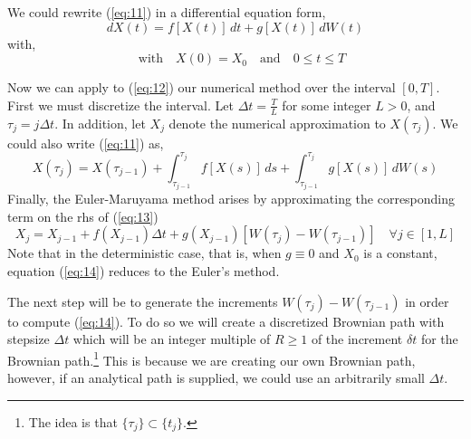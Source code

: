 \documentclass[12pt,a4paper]{article}
\def\d{\delta}
\begin{document}
We could rewrite (\ref{eq:11}) in a differential equation form, 
\begin{equation} \label{eq:12}
dX(t)=f\left[X(t)\right]\,dt+ g\left[X(t)\right]\,dW(t)   
\end{equation}
with, 
$$\quad \text{with}\quad X(0)=X_0 \quad \text{and} \quad 0\leq t\leq T$$

Now we can apply to (\ref{eq:12}) our numerical method over the interval $[0,T]$. First we must discretize the interval. Let $\Delta t = \frac{T}{L}$ for some integer $L>0$, and $\tau_j = j\Delta t$. In addition, let $X_j$ denote the numerical approximation to $X(\tau_j)$. We could also write (\ref{eq:11}) as, 
\begin{equation} \label{eq:13}
X(\tau_j)=X(\tau_{j-1}) +\int_{\tau_{j-1}}^{\tau_j} f\left[X(s)\right]\,ds+\int_{\tau_{j-1}}^{\tau_j} g\left[X(s)\right]\,dW(s)
\end{equation}
Finally, the Euler-Maruyama method arises by approximating the corresponding term on the rhs of (\ref{eq:13}) 
\begin{equation} \label{eq:14}
X_j=X_{j-1}+f(X_{j-1})\Delta t + g(X_{j-1})\left[W(\tau_j)-W(\tau_{j-1})\right] \quad \forall j\in [1,L]   
\end{equation}
Note that in the deterministic case, that is, when $g\equiv 0$ and $X_0$ is a constant, equation (\ref{eq:14}) reduces to the Euler's method. 

The next step will be to generate the increments $W(\tau_j)-W(\tau_{j-1})$ in order to compute (\ref{eq:14}). To do so we will create a discretized Brownian path with stepsize $\Delta t$ which will be an integer multiple of $R\geq 1$ of the increment $\d t$ for the Brownian path.\footnote{The idea is that $\{\tau_j\}\subset \{t_j\}.$} This is because we are creating our own Brownian path, however, if an analytical path is supplied, we could use an arbitrarily small $\Delta t$. 
\end{document}
